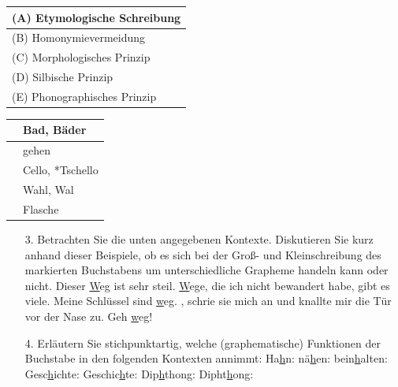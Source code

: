{\begin{frame}
\begin{itemize}
		\begin{minipage}{0.45\textwidth}
			\centering
			\begin{tabular}{|l|}
				\hline
				(A) Etymologische Schreibung\\
				\hline
				(B) Homonymievermeidung\\
				\hline
				(C) Morphologisches Prinzip\\
				\hline
				(D) Silbische Prinzip\\
				\hline
				(E) Phonographisches Prinzip\\
				\hline
			\end{tabular}
		\end{minipage}
		\hfill%
		\begin{minipage}{0.45\textwidth}
			\centering
			\begin{tabular}{|p{}|l|}
				\hline
				& Bad, Bäder \\
				\hline
				& gehen \\
				\hline
				& Cello, *Tschello \\
				\hline
				& Wahl, Wal\\
				\hline
				& Flasche \\
				\hline
			\end{tabular}
		\end{minipage}

	\end{itemize}
\end{frame}


\begin{frame}
	\begin{itemize}
		\item[3.] Betrachten Sie die unten angegebenen Kontexte. Diskutieren Sie kurz anhand dieser Beispiele, ob es sich bei der Groß- und Kleinschreibung des markierten Buchstabens um unterschiedliche Grapheme handeln kann oder nicht.
\eal
			\ex Dieser \underline{W}eg ist sehr steil.
			\ex \underline{W}ege, die ich nicht bewandert habe, gibt es viele.
			\ex Meine Schlüssel sind \underline{w}eg.
			\ex {}, schrie sie mich an und knallte mir die Tür vor der Nase zu.
			\ex Geh \underline{w}eg!
\zl
	\end{itemize}
\end{frame}


\begin{frame}
	\begin{itemize}
		\item[4.] Erläutern Sie stichpunktartig, welche (graphematische) Funktionen der Buchstabe  in den folgenden Kontexten annimmt:
	\eal
			\ex Ha\underline{h}n:
			\ex nä\underline{h}en:
			\ex bein\underline{h}alten:
			\ex Gesc\underline{h}ichte:
			\ex Geschic\underline{h}te:
			\ex Dip\underline{h}thong:
			\ex Dipht\underline{h}ong:
	\zl
	\end{itemize}
\end{frame}


}
